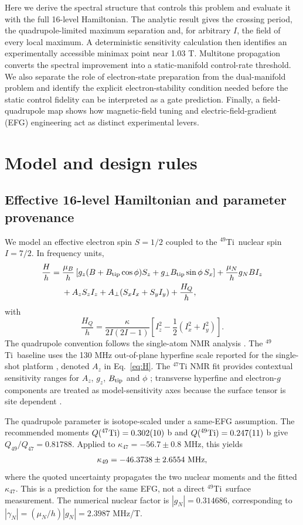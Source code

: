 \documentclass[11pt]{article}
\newcommand{\Ti}{$^{49}$Ti}
\begin{document}
Here we derive the spectral structure that controls this problem and evaluate it with the full 16-level Hamiltonian. The analytic result gives the crossing period, the quadrupole-limited maximum separation and, for arbitrary $I$, the field of every local maximum. A deterministic sensitivity calculation then identifies an experimentally accessible minimax point near 1.03 T. Multitone propagation converts the spectral improvement into a static-manifold control-rate threshold. We also separate the role of electron-state preparation from the dual-manifold problem and identify the explicit electron-stability condition needed before the static control fidelity can be interpreted as a gate prediction. Finally, a field-quadrupole map shows how magnetic-field tuning and electric-field-gradient (EFG) engineering act as distinct experimental levers.

\section{Model and design rules}
\subsection{Effective 16-level Hamiltonian and parameter provenance}
We model an effective electron spin $S=1/2$ coupled to the \Ti\ nuclear spin $I=7/2$. In frequency units,
\begin{align}
\frac{H}{h}={}&\frac{\mu_B}{h}\left[g_z(B+B_{\rm tip}\cos\phi)S_z+g_\perp B_{\rm tip}\sin\phi\,S_x\right]
+\frac{\mu_N}{h}g_NBI_z \nonumber\\
&+A_zS_zI_z+A_\perp(S_xI_x+S_yI_y)+\frac{H_Q}{h},
\label{eq:H}
\end{align}
with
\begin{equation}
\frac{H_Q}{h}=\frac{\kappa}{2I(2I-1)}\left[I_z^2-\frac{1}{2}(I_x^2+I_y^2)\right].
\label{eq:HQ}
\end{equation}
The quadrupole convention follows the single-atom NMR analysis \cite{vennema2025}. The \Ti\ baseline uses the 130 MHz out-of-plane hyperfine scale reported for the single-shot platform \cite{stolte2025}, denoted $A_z$ in Eq.~\eqref{eq:H}. The $^{47}$Ti NMR fit provides contextual sensitivity ranges for $A_z$, $g_z$, $B_{\rm tip}$ and $\phi$ \cite{vennema2025}; transverse hyperfine and electron-$g$ components are treated as model-sensitivity axes because the surface tensor is site dependent \cite{kim2022}.

The quadrupole parameter is isotope-scaled under a same-EFG assumption. The recommended moments $Q(^{47}{\rm Ti})=0.302(10)$ b and $Q(^{49}{\rm Ti})=0.247(11)$ b \cite{stone2016} give $Q_{49}/Q_{47}=0.81788$. Applied to $\kappa_{47}=-56.7\pm0.8$ MHz, this yields
\begin{equation}
\kappa_{49}=-46.3738\pm2.6554\ {\rm MHz},
\end{equation}
where the quoted uncertainty propagates the two nuclear moments and the fitted $\kappa_{47}$. This is a prediction for the same EFG, not a direct \Ti\ surface measurement. The numerical nuclear factor is $|g_N|=0.314686$, corresponding to $|\gamma_N|=(\mu_N/h)|g_N|=2.3987$ MHz/T.
\end{document}
